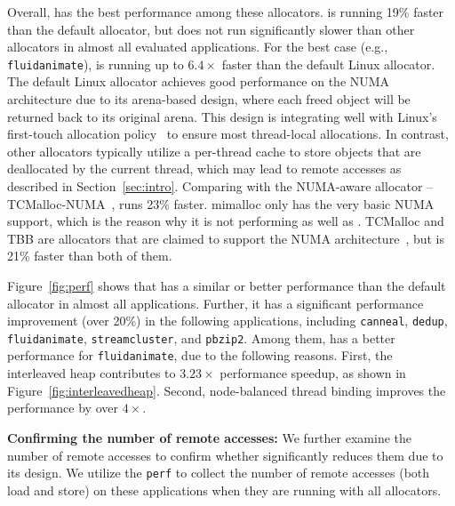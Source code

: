 Overall, \NM{} has the best performance among these allocators. \NM{} is running 19\% faster than the default allocator, but does not run significantly slower than other allocators in almost all evaluated applications. For the best case (e.g., \texttt{fluidanimate}), \NM{} is running up to $6.4\times$ faster than the default Linux allocator.  The default Linux allocator achieves good performance on the NUMA architecture due to its arena-based design, where each freed object will be returned back to its original arena.
This design is integrating well with Linux's first-touch allocation policy~\cite{Lameter:2013:NO:2508834.2513149} to ensure most thread-local allocations. 
In contrast, other allocators typically utilize a per-thread cache to store objects that are deallocated by the current thread, which may lead to remote accesses as described in Section~\ref{sec:intro}.  Comparing with the NUMA-aware allocator -- TCMalloc-NUMA~\cite{tcmallocnew}, \NM{} runs 23\% faster. 
mimalloc only has the very basic NUMA support, which is the reason why it is not performing as well as \NM{}. TCMalloc and TBB are allocators that are claimed to support the NUMA architecture~\cite{tcmalloc2, tbb3}, but \NM{} is 21\% faster than both of them.


Figure~\ref{fig:perf} shows that \NM{} has a similar or better performance than the default allocator in almost all applications. Further, it has a significant performance improvement (over 20\%) in the following applications, including \texttt{canneal}, \texttt{dedup}, \texttt{fluidanimate}, \texttt{streamcluster}, and \texttt{pbzip2}. Among them, \NM{} has a better performance for \texttt{fluidanimate}, due to the following reasons. First, the interleaved heap contributes to $3.23\times$ performance speedup, as shown in Figure~\ref{fig:interleavedheap}. Second, node-balanced thread binding improves the performance by over $4\times$. 

\textbf{Confirming the number of remote accesses:} We further examine the number of remote accesses to confirm whether \NM{} significantly reduces them due to its design. We utilize the \texttt{perf} to collect the number of remote accesses (both load and store) on these applications when they are running with all allocators. 

